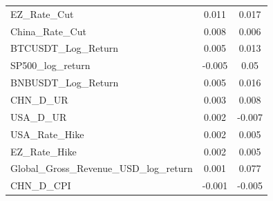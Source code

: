 \begin{table}[ht]
\begin{tabular}{lcc}
    EZ\_Rate\_Cut & 0.011 & 0.017 \\ 
    China\_Rate\_Cut & 0.008 & 0.006 \\ 
    BTCUSDT\_Log\_Return & 0.005 & 0.013 \\ 
    SP500\_log\_return & -0.005 & 0.05 \\ 
    BNBUSDT\_Log\_Return & 0.005 & 0.016 \\ 
    CHN\_D\_UR & 0.003 & 0.008 \\ 
    USA\_D\_UR & 0.002 & -0.007 \\ 
    USA\_Rate\_Hike & 0.002 & 0.005 \\ 
    EZ\_Rate\_Hike & 0.002 & 0.005 \\ 
    Global\_Gross\_Revenue\_USD\_log\_return & 0.001 & 0.077 \\ 
    CHN\_D\_CPI & -0.001 & -0.005 \\ 
    \bottomrule
  \end{tabular}
\end{table}